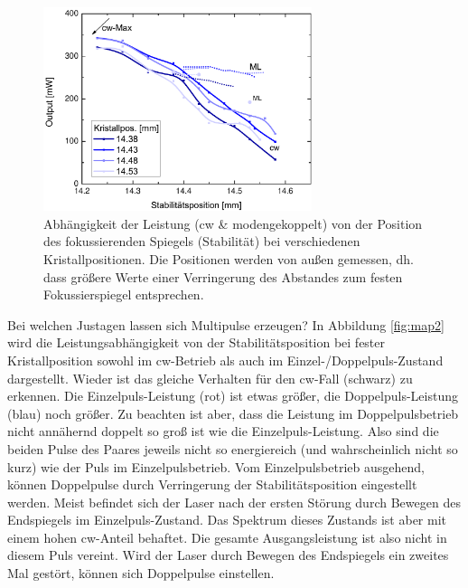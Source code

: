 \documentclass[bachelor,       %
               twoside,        %
               BCOR10mm,       %
               liststotoc,nomtotoc,bibtotoc, %
               english,ngerman, %
               final,          %
               ]{GAUBM}
\begin{document}
\begin{figure}[!htb]
	\centering
	\includegraphics[width=0.7\textwidth]{figures/map.pdf}
	\caption{Abhängigkeit der Leistung (cw \& modengekoppelt) von der Position des fokussierenden Spiegels (Stabilität) bei verschiedenen Kristallpositionen.
	Die Positionen werden von außen gemessen, dh. dass größere Werte einer Verringerung des Abstandes zum festen Fokussierspiegel entsprechen.}
	\label{fig:map}
\end{figure}

Bei welchen Justagen lassen sich Multipulse erzeugen?
In Abbildung \ref{fig:map2} wird die Leistungsabhängigkeit von der Stabilitätsposition bei fester Kristallposition sowohl im cw-Betrieb als auch im Einzel-/Doppelpuls-Zustand  dargestellt.
Wieder ist das gleiche Verhalten für den cw-Fall (schwarz) zu erkennen.
Die Einzelpuls-Leistung (rot) ist etwas größer, die Doppelpuls-Leistung (blau) noch größer.
Zu beachten ist aber, dass die Leistung im Doppelpulsbetrieb nicht annähernd doppelt so groß ist wie die Einzelpuls-Leistung.
Also sind die beiden Pulse des Paares jeweils nicht so energiereich (und wahrscheinlich nicht so kurz) wie der Puls im Einzelpulsbetrieb.
Vom Einzelpulsbetrieb ausgehend, können Doppelpulse durch Verringerung der Stabilitätsposition eingestellt werden.
Meist befindet sich der Laser nach der ersten Störung durch Bewegen des Endspiegels  im Einzelpuls-Zustand.
Das Spektrum dieses Zustands ist aber mit einem hohen cw-Anteil behaftet.
Die gesamte Ausgangsleistung ist also nicht in diesem Puls vereint.
Wird der Laser durch Bewegen des Endspiegels ein zweites Mal gestört, können sich Doppelpulse einstellen.
\end{document}
